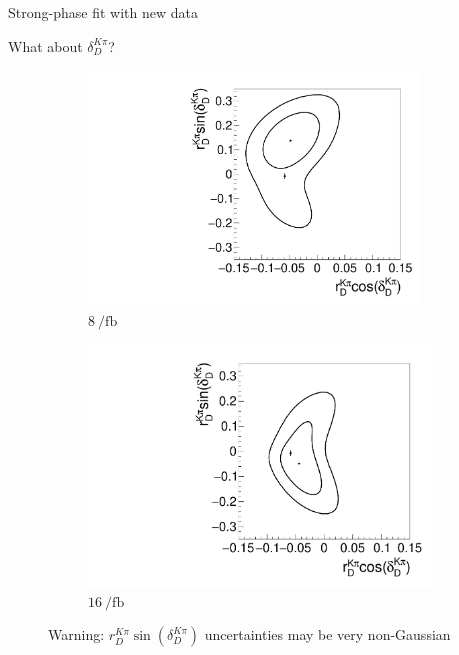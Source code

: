 \documentclass{beamer}
\begin{document}
\begin{frame}{Strong-phase fit with new data}
  \begin{center}
    {\large What about $\delta_D^{K\pi}$?}
  \end{center}
  \vspace{-0.5cm}
  \begin{figure}
    \centering
    \begin{subfigure}{0.45\textwidth}
      \includegraphics[width = 0.97\textwidth]{Plots/Contour_DeltaKpi_8invfb.pdf}
      \caption{$\SI{8}{\per\femto\barn}$}
    \end{subfigure}%
    \hspace{1cm}
    \begin{subfigure}{0.45\textwidth}
      \includegraphics[width = 1.0\textwidth]{Plots/Contour_DeltaKpi_16invfb.pdf}
      \caption{$\SI{16}{\per\femto\barn}$}
    \end{subfigure}
    \caption{Warning: $r_D^{K\pi}\sin(\delta_D^{K\pi})$ uncertainties may be very non-Gaussian}
  \end{figure}
\end{frame}
\end{document}
